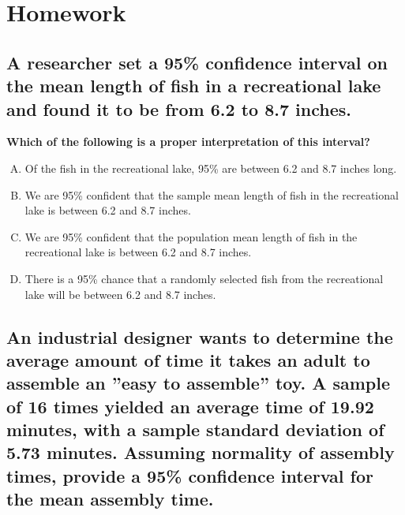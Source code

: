 \section{Homework}

\subsection{A researcher set a 95\% confidence interval on the mean length of fish in a recreational lake and found it to be from 6.2 to 8.7 inches.} 
\textbf{Which of the following is a proper interpretation of this interval?}

\begin{enumerate}[(A)]
\item Of the fish in the recreational lake, 95\% are between 6.2 and 8.7 inches long.
\item We are 95\% confident that the sample mean length of fish in the recreational lake is between 6.2 and 8.7 inches.
\item We are 95\% confident that the population mean length of fish in the recreational lake is between 6.2 and 8.7 inches.
\item There is a 95\% chance that a randomly selected fish from the recreational lake will be between 6.2 and 8.7 inches.
\end{enumerate}

\subsection{An industrial designer wants to determine the average amount of time it takes an adult to assemble an ''easy to assemble'' toy. A sample of 16 times yielded an average time of 19.92 minutes, with a sample standard deviation of 5.73 minutes. Assuming normality of assembly times, provide a 95\% confidence interval for the mean assembly time.}
	
